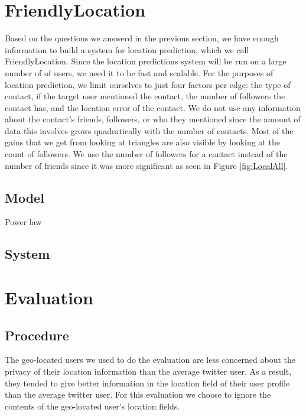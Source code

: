 \documentclass{sig-alternate}
\begin{document}
\section{FriendlyLocation}
Based on the questions we answerd in the previous section, we have enough
information to build a system for location prediction, which we call FriendlyLocation.
Since the location predictions system will be run on a large number of of users, we need it to be fast and scalable.
For the purposes of location prediction, we limit ourselves to just four factors per edge: the type of contact, if the target user mentioned the contact, the number of followers the contact has, and the location error of the contact.
We do not use any information about the contact's friends, followers, or who they mentioned since the amount of data this involves grows quadratically with the number of contacts.
Most of the gains that we get from looking at triangles are also visible by looking at the count of followers.
We use the number of followers for a contact instead of the number of friends since it was more significant as seen in Figure \ref{fig:LocalAll}.

\subsection{Model}
\label{sec:model}

\begin{figure}
\centering
{}
\caption{}
\label{fig:EdgeTypesMdist}
\end{figure}

Power law


\subsection{System}



\section{Evaluation}
\subsection{Procedure}
The geo-located users we used to do the evaluation are less concerned about the
privacy of their location information than the average twitter user.
As a result, they tended to give better information in the location field of
their user profile than the average twitter user.
For this evaluation we choose to ignore the contents of the geo-located user's
location fields.
\end{document}
